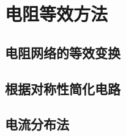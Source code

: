 

\section{电阻等效方法}\label{17-5}

\subsection{电阻网络的等效变换}\label{17-5-1}

\subsection{根据对称性简化电路}\label{17-5-2}

\subsection{电流分布法}\label{17-5-3}